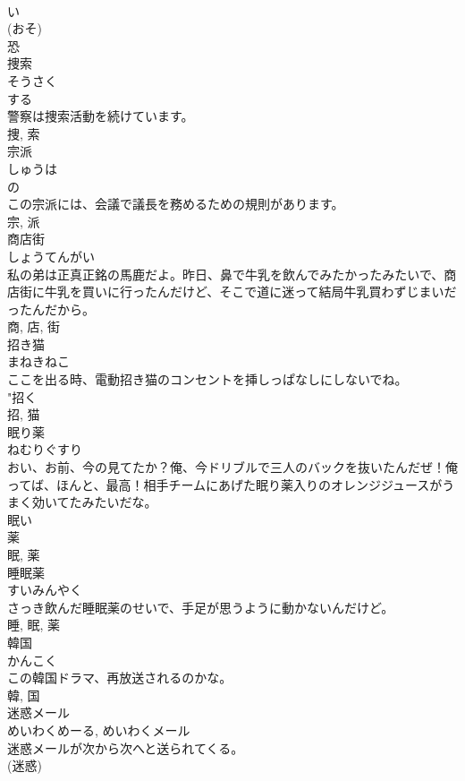 \documentclass[8pt]{extreport}
\begin{document}
\begin{CJK}{UTF8}{min}
\\	い 
\\	(おそ) 
\\	恐	
\\	捜索	
\\	そうさく	
\\	する 
\\	警察は捜索活動を続けています。	
\\	捜, 索	
\\	宗派	
\\	しゅうは	
\\	の 
\\	この宗派には、会議で議長を務めるための規則があります。	
\\	宗, 派	
\\	商店街	
\\	しょうてんがい	
\\	私の弟は正真正銘の馬鹿だよ。昨日、鼻で牛乳を飲んでみたかったみたいで、商店街に牛乳を買いに行ったんだけど、そこで道に迷って結局牛乳買わずじまいだったんだから。	
\\	商, 店, 街	
\\	招き猫	
\\	まねきねこ	
\\	ここを出る時、電動招き猫のコンセントを挿しっぱなしにしないでね。	
\\	"招く 
\\	招, 猫	
\\	眠り薬	
\\	ねむりぐすり	
\\	おい、お前、今の見てたか？俺、今ドリブルで三人のバックを抜いたんだぜ！俺ってば、ほんと、最高！相手チームにあげた眠り薬入りのオレンジジュースがうまく効いてたみたいだな。	
\\	眠い 
\\	薬 
\\	眠, 薬	
\\	睡眠薬	
\\	すいみんやく	
\\	さっき飲んだ睡眠薬のせいで、手足が思うように動かないんだけど。	
\\	睡, 眠, 薬	
\\	韓国	
\\	かんこく	
\\	この韓国ドラマ、再放送されるのかな。	
\\	韓, 国	
\\	迷惑メール	
\\	めいわくめーる, めいわくメール	
\\	迷惑メールが次から次へと送られてくる。	
\\	(迷惑) 

\end{CJK}
\end{document}
